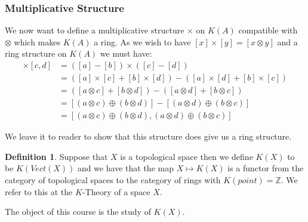 \documentclass[a4paper,10pt]{article}
\theoremstyle{plain}%
\theoremstyle{definition}
\newtheorem{defn}{Definition}
\theoremstyle{remark}
\newcommand{\ZZ}{\mathbb{Z}}
\begin{document}
\subsubsection{Multiplicative Structure}

We now want to define a multiplicative structure $\times$ on $K(A)$ compatible with $\otimes$ which makes $K(A)$
a ring. As we wish to have $[x]\times[y]=[x\otimes y]$ and a ring structure on $K(A)$ we must have:
\begin{align*}
 [a,b]\times[c,d] &= ([a]-[b])\times([c]-[d])\\
		  &= ([a]\times[c]+[b]\times[d])-([a]\times[d]+[b]\times[c])\\
		  &= ([a\otimes c]+[b\otimes d])-([a\otimes d]+[b\otimes c])\\
		  &= [(a\otimes c)\oplus(b\otimes d)]-[(a\otimes d)\oplus(b\otimes c)]\\
		  &= [(a\otimes c)\oplus(b\otimes d),(a\otimes d)\oplus(b\otimes c)]
\end{align*}

We leave it to reader to show that this structure does give us a ring structure.

\begin{defn}
 Suppose that $X$ is a topological space then we define $K(X)$ to be $K(Vect(X))$ and we have that the map $X\mapsto K(X)$
is a functor from the category of topological spaces to the category of rings with $K(point)=\ZZ$. We refer to this at the $K$-Theory of a space $X$.
\end{defn}

The object of this course is the study of $K(X)$.
\end{document}
